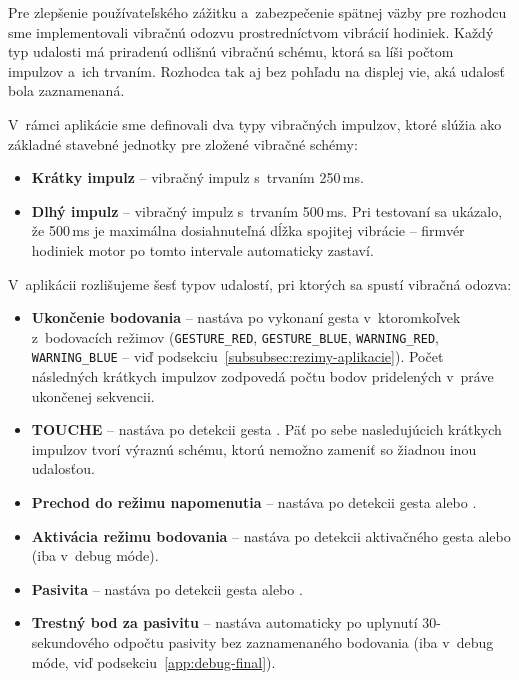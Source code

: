 Pre zlepšenie používateľského zážitku a~zabezpečenie
spätnej väzby pre rozhodcu sme implementovali
vibračnú odozvu prostredníctvom vibrácií hodiniek.
Každý typ udalosti má priradenú odlišnú vibračnú
schému, ktorá sa líši počtom impulzov a~ich trvaním.
Rozhodca tak aj bez pohľadu na displej vie, aká
udalosť bola zaznamenaná.

V~rámci aplikácie sme definovali dva typy vibračných
impulzov, ktoré slúžia ako základné stavebné jednotky
pre zložené vibračné schémy:

\begin{itemize}
  \item \textbf{Krátky impulz}
        \label{vib:short} -- vibračný impulz s~trvaním
        250\,ms.

  \item \textbf{Dlhý impulz}
        \label{vib:long} -- vibračný impulz s~trvaním
        500\,ms. Pri testovaní sa ukázalo, že 500\,ms
        je maximálna dosiahnuteľná dĺžka spojitej
        vibrácie -- firmvér hodiniek motor po tomto
        intervale automaticky zastaví.
\end{itemize}

\noindent V~aplikácii rozlišujeme šesť typov udalostí, pri ktorých sa
spustí vibračná odozva:

\begin{itemize}
  \item \textbf{Ukončenie bodovania} -- nastáva po vykonaní
        gesta  v~ktoromkoľvek z~bodovacích režimov
        (\texttt{GESTURE\_RED}, \texttt{GESTURE\_BLUE},
        \texttt{WARNING\_RED}, \texttt{WARNING\_BLUE} --
        viď podsekciu~\ref{subsubsec:rezimy-aplikacie}). Počet
        následných krátkych impulzov zodpovedá počtu bodov
        pridelených v~práve ukončenej sekvencii.

  \item \textbf{TOUCHE} -- nastáva po detekcii gesta .
        Päť po sebe nasledujúcich krátkych impulzov tvorí
        výraznú schému, ktorú nemožno zameniť so žiadnou inou
        udalosťou.

  \item \textbf{Prechod do režimu napomenutia} -- nastáva po
        detekcii gesta  alebo
        .

  \item \textbf{Aktivácia režimu bodovania} -- nastáva po
        detekcii aktivačného gesta  alebo
         (iba v~debug móde).

  \item \textbf{Pasivita} -- nastáva po
        detekcii gesta  alebo
        .

  \item \textbf{Trestný bod za pasivitu} -- nastáva automaticky
        po uplynutí 30-sekundového odpočtu pasivity bez
        zaznamenaného bodovania (iba v~debug móde, viď
        podsekciu~\ref{app:debug-final}).
\end{itemize}

